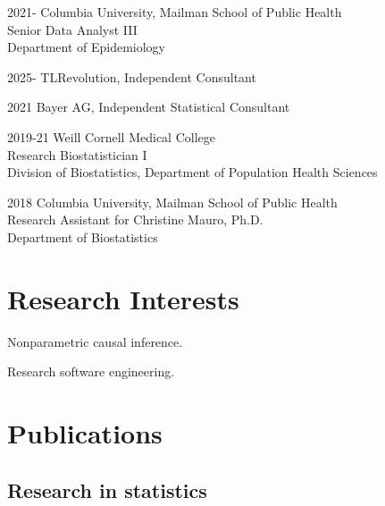 \documentclass[12pt,letterpaper]{report}
\newcommand{\listitemspace}{0.15em}
\renewenvironment{itemize}
{\begin{list}{}{\setlength{\leftmargin}{0em}
            \setlength{\parskip}{0em}
            \setlength{\itemsep}{\listitemspace}
            \setlength{\parsep}{\listitemspace}}}
    {\end{list}}
\begin{document}
    \begin{tablist}
    
    	\item[2021-] \tab Columbia University, Mailman School of Public Health \\
						  Senior Data Analyst III \\
						  Department of Epidemiology
						  
	\item[2025-] \tab TLRevolution, Independent Consultant
						  
	\item[2021] \tab Bayer AG, Independent Statistical Consultant

        \item[2019-21] \tab Weill Cornell Medical College \\
                            Research Biostatistician I  \\
                            Division of Biostatistics, Department of Population Health Sciences 
        
        \item[2018]  \tab Columbia University, Mailman School of Public Health \\
                          Research Assistant for Christine Mauro, Ph.D. \\
                          Department of Biostatistics

    \end{tablist}

    \section*{Research Interests}

    \begin{itemize}

        \item Nonparametric causal inference.

        \item Research software engineering.

    \end{itemize}

    \section*{Publications}
    
    \subsection*{Research in statistics}
    
\end{document}
